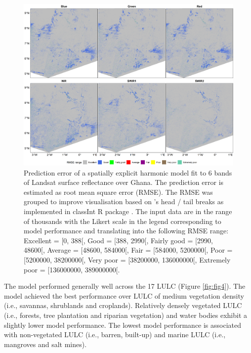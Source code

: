 \documentclass[12pt,oneside,preprint,3p,authoryear,times]{elsarticle} %
\begin{document}
\begin{figure}[!htbp]

{\centering \includegraphics[width=1\linewidth,]{figures/pngs/Ghana_rmse_maps} 

}

\caption{Prediction error of a spatially explicit harmonic model fit to 6 bands of Landsat surface reflectance over Ghana. The prediction error is estimated as root mean square error (RMSE). The RMSE was grouped to improve visualisation based on \citet{Jiang-2013}'s head / tail breaks as implemented in classInt R package \citep{Bivand-2020}. The input data are in the range of thousands with the Likert scale in the legend corresponding to model performance and translating into the following RMSE range: Excellent = [0, 388[, Good = [388, 2990[, Fairly  good = [2990, 48600[, Average = [48600, 584000[, Fair = [584000, 5200000[, Poor = [5200000, 38200000[, Very poor = [38200000, 136000000[, Extremely poor = [136000000, 389000000[.}\label{fig:fig3}
\end{figure}

The model performed generally well across the 17 LULC (Figure
\ref{fig:fig4}). The model achieved the best performance over LULC of
medium vegetation density (i.e., savannas, shrublands and croplands).
Relatively densely vegetated LULC (i.e., forests, tree plantation and
riparian vegetation) and water bodies exhibit a slightly lower model
performance. The lowest model performance is associated with
non-vegetated LULC (i.e., barren, built-up) and marine LULC (i.e.,
mangroves and salt mines).
\end{document}
